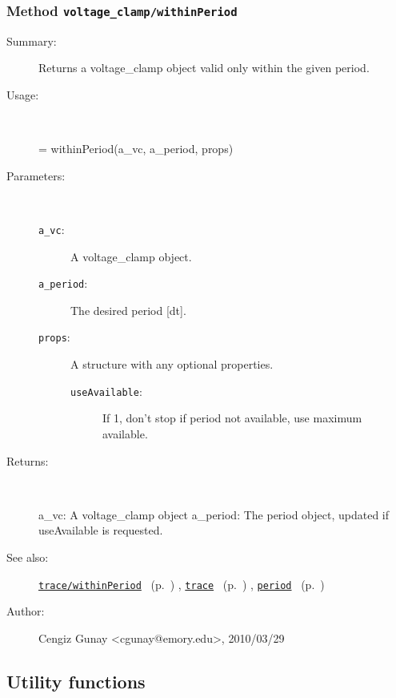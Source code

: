 \subsubsection[Method \texttt{withinPeriod}]{Method \texttt{voltage\_clamp/withinPeriod}}%
%
\label{ref_voltage_clamp__withinPeriod}%
\hypertarget{ref_voltage_clamp__withinPeriod}{}%
\begin{description}
\item[Summary:]Returns a voltage\_clamp object valid only within the given period.
%
\item[Usage:]~%
\begin{lyxcode}%
[a\_vc a\_period] = withinPeriod(a\_vc, a\_period, props)
%
\end{lyxcode}%
%
%
\item[Parameters:]~
\begin{description}%
\item[\texttt{a\_vc}:]
 A voltage\_clamp object.
\item[\texttt{a\_period}:]
 The desired period [dt].
\item[\texttt{props}:]
 A structure with any optional properties.
\begin{description}%
\item[\texttt{useAvailable}:]
 If 1, don't stop if period not available, use maximum available.
\end{description}%
\end{description}%
%
\item[Returns:
]~

   a\_vc: A voltage\_clamp object
   a\_period: The period object, updated if useAvailable is requested.
%
%
\item[See also:]%
\hyperlink{ref_trace__withinPeriod}{\texttt{trace/withinPeriod}}%
\ (p.~\pageref{ref_trace__withinPeriod})%
%
, \hyperlink{ref_trace}{\texttt{trace}}%
\ (p.~\pageref{ref_trace})%
%
, \hyperlink{ref_period}{\texttt{period}}%
\ (p.~\pageref{ref_period})%
%
%
\item[Author:]%
Cengiz Gunay <cgunay@emory.edu>, 2010/03/29
%
\end{description}
\methodline%
\subsection{Utility functions}%
\label{ref_utils}%
\hypertarget{ref_utils}{}%
